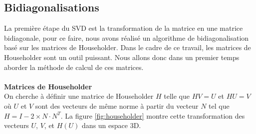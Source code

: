 \documentclass{article}
\begin{document}
\subsection{Bidiagonalisations}
\label{sec:bidiagonalisation}
La première étape du SVD est la transformation de la matrice en une matrice bidiagonale, pour ce faire, nous avons réalisé un algorithme de bidiagonalisation basé sur les matrices de Householder. Dans le cadre de ce travail, les matrices de Householder sont un outil puissant. Nous allons donc dans un premier temps aborder la méthode de calcul de ces matrices.\\ \\
\textbf{Matrices de Householder}\\
On cherche à définir une matrice de Householder $H$ telle que $HV = U$ et $HU = V$ où $U$ et $V$ sont des vecteurs de même norme à partir du vecteur $N$ tel que $H = I - 2 \times N \cdot N^T$. La figure \ref{fig:householder} montre cette transformation des vecteurs $U$, $V$, et $H(U)$ dans un espace 3D.
\end{document}
